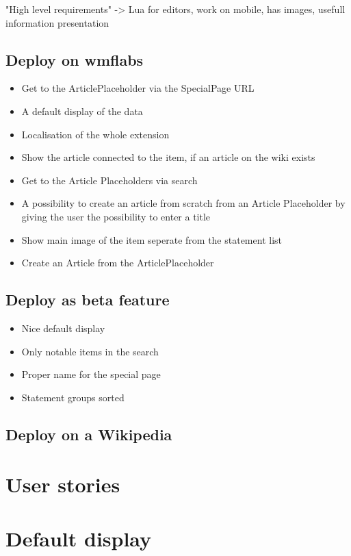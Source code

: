 \documentclass[11pt]{article}
\begin{document}
"High level requirements" -> Lua for editors, work on mobile, has images, usefull information presentation

\subsection[wmflabs]{Deploy on wmflabs}
\begin{itemize}
\item Get to the ArticlePlaceholder via the SpecialPage URL
\item A default display of the data
\item Localisation of the whole extension
\item Show the article connected to the item, if an article on the wiki exists
\item Get to the Article Placeholders via search
\item A possibility to create an article from scratch from an Article Placeholder by giving the user the possibility to enter a title
\item Show main image of the item seperate from the statement list
\item Create an Article from the ArticlePlaceholder
\end{itemize}

\subsection[betafeature]{Deploy as beta feature}
\begin{itemize}
\item Nice default display
\item Only notable items in the search
\item Proper name for the special page
\item Statement groups sorted
\end{itemize}

\subsection[deploy]{Deploy on a Wikipedia}

\section{User stories}

\section {Default display}
\end{document}
